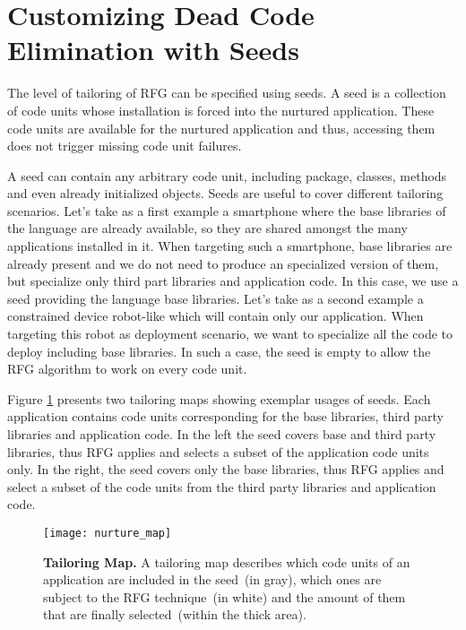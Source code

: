 \section{Customizing Dead Code Elimination with Seeds}\label{sec:seeds}

The level of tailoring of RFG can be specified using seeds. A seed is a collection of code units whose installation is forced into the nurtured application. These code units are available for the nurtured application and thus, accessing them does not trigger missing code unit failures.

A seed can contain any arbitrary code unit, including package, classes, methods and even already initialized objects. Seeds are useful to cover different tailoring scenarios. Let's take as a first example a smartphone where the base libraries of the language are already available, so they are shared amongst the many applications installed in it. When targeting such a smartphone, base libraries are already present and we do not need to produce an specialized version of them, but specialize only third part libraries and application code. In this case, we use a seed providing the language base libraries. Let's take as a second example a constrained device robot-like which will contain only our application. When targeting this robot as deployment scenario, we want to specialize all the code to deploy including base libraries. In such a case, the seed is empty to allow the RFG algorithm to work on every code unit.

Figure \ref{fig:nurturing_map_model} presents two tailoring maps showing exemplar usages of seeds. Each application contains code units corresponding for the base libraries, third party libraries and application code. In the left the seed covers base and third party libraries, thus RFG applies and selects a subset of the application code units only. In the right, the seed covers only the base libraries, thus RFG applies and select a subset of the code units from the third party libraries and application code.

\begin{figure}[ht]
\begin{center}
\texttt{[image: nurture\_map]}
\caption{\small\textbf{Tailoring Map.} A tailoring map describes which code units of an application are included in the seed~(in gray), which ones are subject to the RFG technique~(in white) and the amount of them that are finally selected~(within the thick area).
\label{fig:nurturing_map_model}}
\end{center}
\end{figure}


